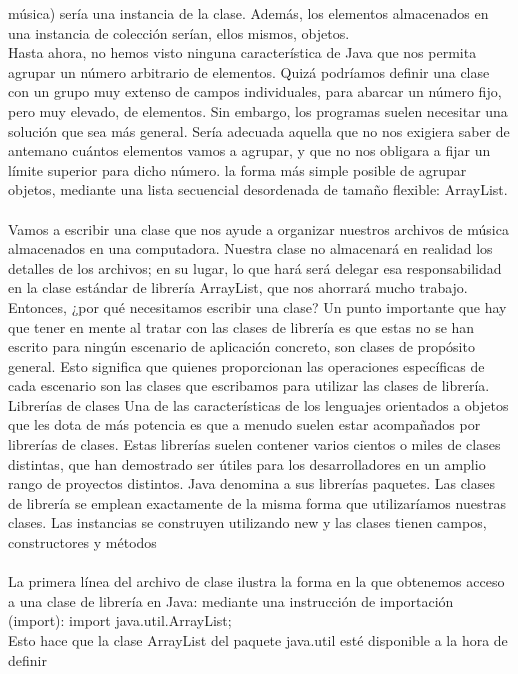 \documentclass[11pt,a4paper]{article}
\begin{document}
	música) sería una instancia de la clase. Además, los elementos almacenados en una instancia
	de colección serían, ellos mismos, objetos.\\
	Hasta ahora, no hemos visto ninguna característica de Java que nos permita agrupar un número
	arbitrario de elementos. Quizá podríamos definir una clase con un grupo muy extenso de campos
	individuales, para abarcar un número fijo, pero muy elevado, de elementos. Sin embargo, los
	programas suelen necesitar una solución que sea más general. Sería adecuada aquella que no nos
	exigiera saber de antemano cuántos elementos vamos a agrupar, y que no nos obligara a fijar un
	límite superior para dicho número. la forma más simple posible de agrupar objetos, mediante una lista secuencial desordenada
	de tamaño flexible: ArrayList.\\
	\\
	Vamos a escribir una clase que nos ayude a organizar nuestros archivos de música almacenados
	en una computadora. Nuestra clase no almacenará en realidad los detalles de los archivos; en su
	lugar, lo que hará será delegar esa responsabilidad en la clase estándar de librería ArrayList, que
	nos ahorrará mucho trabajo. Entonces, ¿por qué necesitamos escribir una clase? Un punto importante
	que hay que tener en mente al tratar con las clases de librería es que estas no se han escrito
	para ningún escenario de aplicación concreto, son clases de propósito general. Esto significa que quienes proporcionan las
	operaciones específicas de cada escenario son las clases que escribamos para utilizar las clases de
	librería.\\
	Librerías de clases Una de las características de los lenguajes orientados a objetos que les dota
	de más potencia es que a menudo suelen estar acompañados por librerías de clases. Estas librerías
	suelen contener varios cientos o miles de clases distintas, que han demostrado ser útiles para los
	desarrolladores en un amplio rango de proyectos distintos. Java denomina a sus librerías paquetes. Las
	clases de librería se emplean exactamente de la misma forma que utilizaríamos nuestras clases. Las
	instancias se construyen utilizando new y las clases tienen campos, constructores y métodos\\
	\\
	La primera línea del archivo de clase ilustra la forma en la que obtenemos acceso a una clase de
	librería en Java: mediante una instrucción de importación (import):
	import java.util.ArrayList;\\
	Esto hace que la clase ArrayList del paquete java.util esté disponible a la hora de definir
\end{document}
